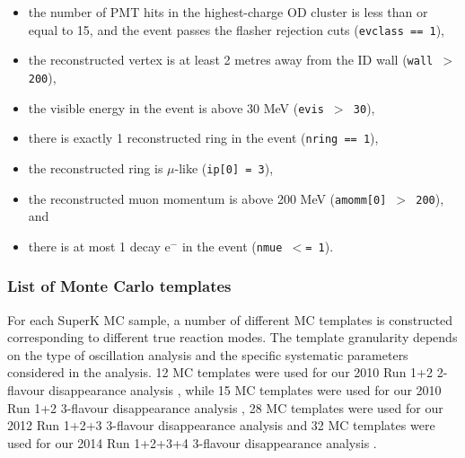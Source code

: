 \begin{itemize}
\item
the number of PMT hits in the highest-charge OD cluster is less than or
equal to 15, and the event passes the flasher rejection cuts
({\tt evclass == 1}),
\item
the reconstructed vertex is at least 2 metres away from the ID wall 
({\tt wall $>$ 200}),
\item
the visible energy in the event is above 30 MeV 
({\tt evis  $>$ 30}),
\item
there is exactly 1 reconstructed ring in the event 
({\tt nring == 1}),
\item
the reconstructed ring is $\mu$-like 
({\tt ip[0] = 3}),
\item
the reconstructed muon momentum is above 200 MeV 
({\tt amomm[0] $>$ 200}), and
\item
there is at most 1 decay e$^{-}$ in the event 
({\tt nmue $<$= 1}).
\end{itemize}

\subsubsection {List of Monte Carlo templates}
\label{sec:mc_templates:template_list}

For each SuperK MC sample, a number of different MC templates is constructed 
corresponding to different true reaction modes.
The template granularity depends on the type of oscillation analysis and the specific 
systematic parameters considered in the analysis.
12 MC templates were used for our 2010 Run 1+2 2-flavour disappearance analysis \cite{OurRun12DisappAnalysis}, while
15 MC templates were used for our 2010 Run 1+2 3-flavour disappearance analysis \cite{OurRun12DisappAnalysis3Flavour},
28 MC templates were used for our 2012 Run 1+2+3 3-flavour disappearance analysis \cite{OurRun123DisappAnalysis3Flavour} and
32 MC templates were used for our 2014 Run 1+2+3+4 3-flavour disappearance analysis \cite{OurRun1234DisappAnalysis3Flavour}.

